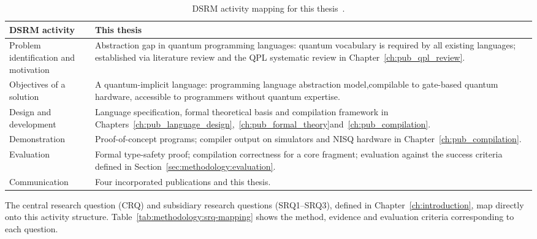 \begin{table}[h]
    \centering
    \begin{tabular}{lp{}}
        \toprule
        \textbf{DSRM activity}                & \textbf{This thesis}                                                                                                                                                                                               \\
        \midrule
        Problem identification and motivation & Abstraction gap in quantum programming languages: quantum vocabulary is required by all existing languages; established via literature review and the QPL systematic review in Chapter~\ref{ch:pub_qpl_review}. \\
        Objectives of a solution              & A quantum-implicit language: programming language abstraction model,compilable to gate-based quantum hardware, accessible to programmers without quantum expertise.                                                \\
        Design and development                & Language specification, formal theoretical basis and compilation framework in Chapters~\ref{ch:pub_language_design},~\ref{ch:pub_formal_theory}and~\ref{ch:pub_compilation}.                              \\
        Demonstration                         & Proof-of-concept programs; compiler output on simulators and NISQ hardware in Chapter~\ref{ch:pub_compilation}.                                                                                                 \\
        Evaluation                            & Formal type-safety proof; compilation correctness for a core fragment; evaluation against the success criteria defined in Section~\ref{sec:methodology:evaluation}.                                                \\
        Communication                         & Four incorporated publications and this thesis.                                                                                                                                                                    \\
        \bottomrule
    \end{tabular}
    \caption{DSRM activity mapping for this thesis~\cite{Peffers2007DSRM}.}
    \label{tab:methodology:dsrm-mapping}
\end{table}

The central research question (CRQ) and subsidiary research questions (SRQ1--SRQ3), defined in Chapter~\ref{ch:introduction}, map directly onto this activity structure.
Table~\ref{tab:methodology:srq-mapping} shows the method, evidence and evaluation criteria corresponding to each question.

